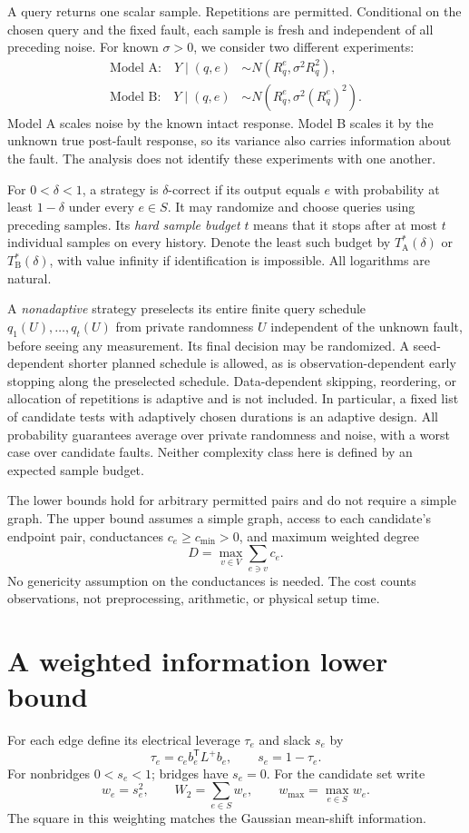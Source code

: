\documentclass[11pt,letterpaper]{article}
\begin{document}
A query returns one scalar sample. Repetitions are permitted. Conditional on the chosen query and the fixed fault, each sample is fresh and independent of all preceding noise. For known $\sigma>0$, we consider two different experiments:
\[
 \begin{aligned}
 \text{Model A:}\quad Y\mid(q,e)&\sim N(R_q^e,\sigma^2R_q^2),\\
 \text{Model B:}\quad Y\mid(q,e)&\sim N(R_q^e,\sigma^2(R_q^e)^2).
 \end{aligned}
\]
Model A scales noise by the known intact response. Model B scales it by the unknown true post-fault response, so its variance also carries information about the fault. The analysis does not identify these experiments with one another.

For $0<\delta<1$, a strategy is $\delta$-correct if its output equals $e$ with probability at least $1-\delta$ under every $e\in S$. It may randomize and choose queries using preceding samples. Its \emph{hard sample budget} $t$ means that it stops after at most $t$ individual samples on every history. Denote the least such budget by $T^*_{\mathrm A}(\delta)$ or $T^*_{\mathrm B}(\delta)$, with value infinity if identification is impossible. All logarithms are natural.

A \emph{nonadaptive} strategy preselects its entire finite query schedule $q_1(U),\ldots,q_t(U)$ from private randomness $U$ independent of the unknown fault, before seeing any measurement. Its final decision may be randomized. A seed-dependent shorter planned schedule is allowed, as is observation-dependent early stopping along the preselected schedule. Data-dependent skipping, reordering, or allocation of repetitions is adaptive and is not included. In particular, a fixed list of candidate tests with adaptively chosen durations is an adaptive design. All probability guarantees average over private randomness and noise, with a worst case over candidate faults. Neither complexity class here is defined by an expected sample budget.

The lower bounds hold for arbitrary permitted pairs and do not require a simple graph. The upper bound assumes a simple graph, access to each candidate's endpoint pair, conductances $c_e\ge c_{\min}>0$, and maximum weighted degree
\[
 D=\max_{v\in V}\sum_{e\ni v}c_e.
\]
No genericity assumption on the conductances is needed. The cost counts observations, not preprocessing, arithmetic, or physical setup time.

\section{A weighted information lower bound}
For each edge define its electrical leverage $\tau_e$ and slack $s_e$ by
\[
 \tau_e=c_e b_e^{\mathsf T}L^+b_e,\qquad s_e=1-\tau_e.
\]
For nonbridges $0<s_e<1$; bridges have $s_e=0$. For the candidate set write
\[
 w_e=s_e^2,\qquad W_2=\sum_{e\in S}w_e,\qquad
 w_{\max}=\max_{e\in S}w_e.
\]
The square in this weighting matches the Gaussian mean-shift information.
\end{document}
